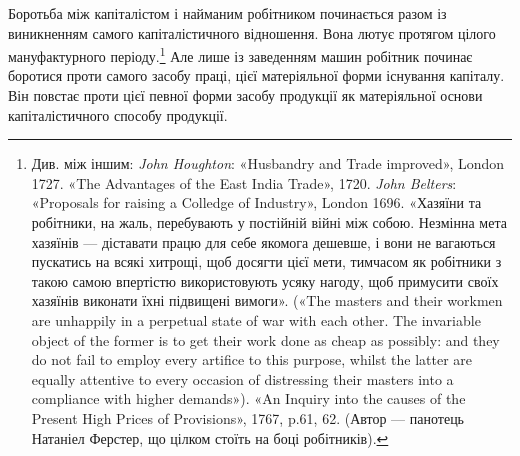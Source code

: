Боротьба між капіталістом і найманим робітником починається
разом із виникненням самого капіталістичного відношення. Вона
лютує протягом цілого мануфактурного періоду.\footnote{
Див. між іншим: \emph{John Houghton}: «Husbandry and Trade improved»,
London 1727. «The Advantages of the East India Trade», 1720.
\emph{John Belters}: «Proposals for raising a Colledge of Industry», London
1696. «Хазяїни та робітники, на жаль, перебувають у постійній війні
між собою. Незмінна мета хазяїнів — діставати працю для себе якомога
дешевше, і вони не вагаються пускатись на всякі хитрощі, щоб досягти
цієї мети, тимчасом як робітники з такою самою впертістю використовують
усяку нагоду, щоб примусити своїх хазяїнів виконати їхні підвищені
вимоги». («The masters and their workmen are unhappily in a perpetual
state of war with each other. The invariable object of the former is to
get their work done as cheap as possibly: and they do not fail to employ
every artifice to this purpose, whilst the latter are equally attentive to
every occasion of distressing their masters into a compliance with higher
demands»). «An Inquiry into the causes of the Present High Prices of
Provisions», 1767, p.61, 62. (Автор — панотець Натаніел Ферстер, що цілком
стоїть на боці робітників).
} Але лише із заведенням машин робітник починає боротися проти самого
засобу праці, цієї матеріяльної форми існування капіталу. Він
повстає проти цієї певної форми засобу продукції як матеріяльної
основи капіталістичного способу продукції.

